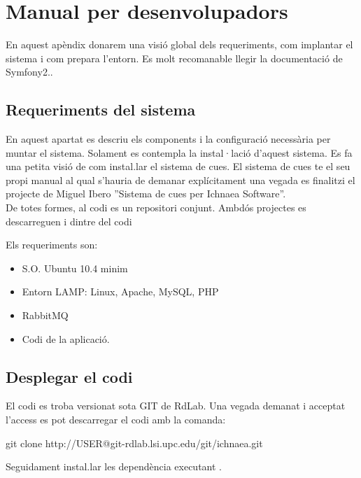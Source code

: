 \chapter{Manual per desenvolupadors}
\label{cha:sysguide}

En aquest apèndix donarem una visió global dels requeriments, com implantar el sistema i com prepara l'entorn. Es molt recomanable llegir la documentació de Symfony2.\cite{symfony}.

\section{Requeriments del sistema}
En aquest apartat es descriu els components i la configuració necessària per muntar el sistema. Solament es contempla la instal·lació d'aquest sistema. Es fa una petita visió de com instal.lar el sistema de cues. El sistema de cues te el seu propi manual al qual s'hauria de demanar explícitament una vegada es finalitzi el projecte de Miguel Ibero ''Sistema de cues per Ichnaea Software''.\\

De totes formes, al codi es un repositori conjunt. Ambdós projectes es descarreguen i dintre del codi 

Els requeriments son:
\begin{itemize}
\item S.O. Ubuntu 10.4 minim
\item Entorn LAMP: Linux, Apache, MySQL, PHP
\item RabbitMQ
\item Codi de la aplicació.
\end{itemize}

\section{Desplegar el codi}
\label{sec:deploy}
El codi es troba versionat sota GIT de RdLab. Una vegada demanat i acceptat l'access es pot descarregar el codi amb la comanda:
\begin{center}
git clone http://USER@git-rdlab.lsi.upc.edu/git/ichnaea.git
\end{center}
Seguidament instal.lar les dependència executant .

